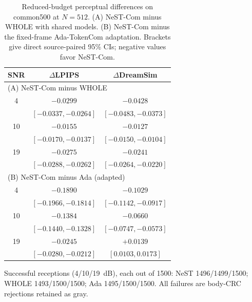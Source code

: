 \begin{table}[t]
\caption{Reduced-budget perceptual differences on common500 at $N=512$. (A) NeST-Com minus WHOLE with shared models. (B) NeST-Com minus the fixed-frame Ada-TokenCom adaptation. Brackets give direct source-paired 95\% CIs; negative values favor NeST-Com.}
\label{tab:reduced}
\centering\footnotesize
\setlength{\tabcolsep}{4pt}
\begin{tabular}{ccc}
\toprule SNR & $\Delta$LPIPS & $\Delta$DreamSim \\
\midrule
\multicolumn{3}{l}{(A) NeST-Com minus WHOLE} \\
4 & $-0.0299$ & $-0.0428$ \\
 & $[-0.0337,-0.0264]$ & $[-0.0483,-0.0373]$ \\
10 & $-0.0155$ & $-0.0127$ \\
 & $[-0.0170,-0.0137]$ & $[-0.0150,-0.0104]$ \\
19 & $-0.0275$ & $-0.0241$ \\
 & $[-0.0288,-0.0262]$ & $[-0.0264,-0.0220]$ \\
\midrule
\multicolumn{3}{l}{(B) NeST-Com minus Ada (adapted)} \\
4 & $-0.1890$ & $-0.1029$ \\
 & $[-0.1966,-0.1814]$ & $[-0.1142,-0.0917]$ \\
10 & $-0.1384$ & $-0.0660$ \\
 & $[-0.1440,-0.1328]$ & $[-0.0747,-0.0573]$ \\
19 & $-0.0245$ & $+0.0139$ \\
 & $[-0.0280,-0.0212]$ & $[0.0103,0.0173]$ \\
\bottomrule
\end{tabular}
\par\smallskip\begin{minipage}{\columnwidth}\footnotesize
Successful receptions (4/10/19~dB), each out of 1500: NeST 1496/1499/1500; WHOLE 1493/1500/1500; Ada 1495/1500/1500. All failures are body-CRC rejections retained as gray.
\end{minipage}
\end{table}

